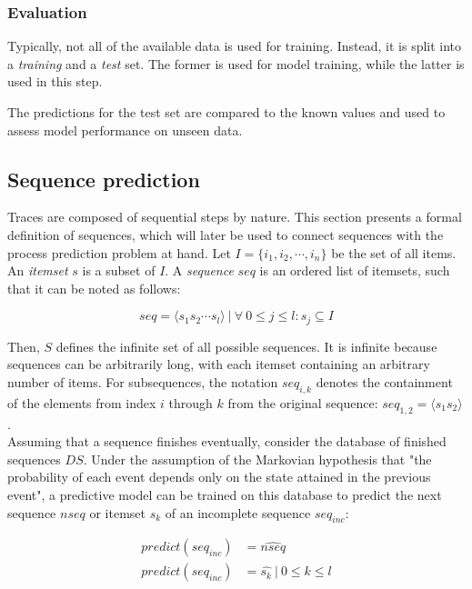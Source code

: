 \subsubsection*{Evaluation}
Typically, not all of the available data is used for training. Instead, it is split into a \textit{training} and a \textit{test} set. The former is used for model training, while the latter is used in this step.

The predictions for the test set are compared to the known values and used to assess model performance on unseen data.

\subsection{Sequence prediction}
\label{sec:sequence-prediction}
Traces are composed of sequential steps by nature. This section presents a formal definition of sequences, which will later be used to connect sequences with the process prediction problem at hand. Let $I = \{i_1, i_2, \cdots, i_n\}$ be the set of all items. An \textit{itemset} $s$ is a subset of $I$. A \textit{sequence} $seq$ is an ordered list of itemsets, such that it can be noted as follows:

$$seq = \langle s_1s_2\cdots s_l \rangle\ |\ \forall\ 0 \leq j \leq l: s_j \subseteq I$$

Then, $S$ defines the infinite set of all possible sequences. It is infinite because sequences can be arbitrarily long, with each itemset containing an arbitrary number of items. For  subsequences, the notation $seq_{i,k}$ denotes the containment of the elements from index $i$ through $k$ from the original sequence: $seq_{1,2} = \langle s_1s_2 \rangle$.\\

Assuming that a sequence finishes eventually, consider the database of finished sequences $DS$. Under the assumption of the Markovian hypothesis that "the probability of each event depends only on the state attained in the previous event"\cite{gagniuc2017markov}, a predictive model can be trained on this database to predict the next sequence $nseq$ or itemset $s_k$ of an incomplete sequence $seq_{inc}$:

\begin{equation}
\begin{split}
    predict(seq_{inc}) &= \widehat{nseq}\\
    predict(seq_{inc}) &= \hat{s_k}\ |\ 0 \leq k \leq l
\end{split}
\label{eq:prediction-from-sequence}
\end{equation}

